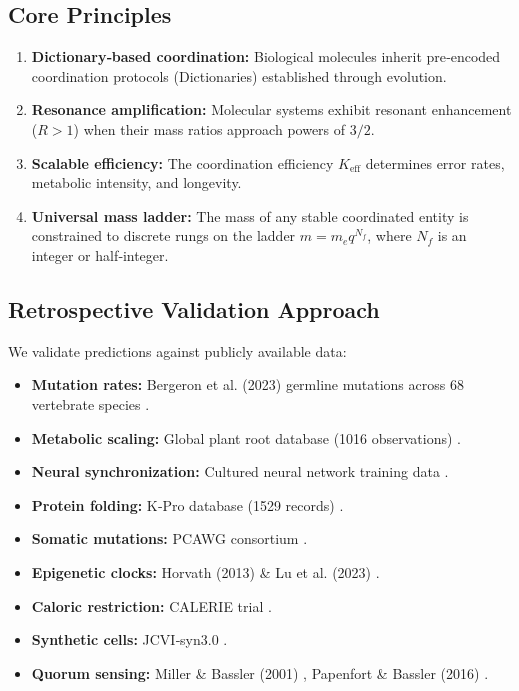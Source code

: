 \documentclass[11pt,a4paper]{article}
\begin{document}
	\subsection{Core Principles}
	
	\begin{enumerate}
		\item \textbf{Dictionary‑based coordination:} Biological molecules inherit pre‑encoded coordination protocols (Dictionaries) established through evolution.
		\item \textbf{Resonance amplification:} Molecular systems exhibit resonant enhancement (\(R > 1\)) when their mass ratios approach powers of \(3/2\).
		\item \textbf{Scalable efficiency:} The coordination efficiency \(K_{\mathrm{eff}}\) determines error rates, metabolic intensity, and longevity.
		\item \textbf{Universal mass ladder:} The mass of any stable coordinated entity is constrained to discrete rungs on the ladder \(m = m_e q^{N_f}\), where \(N_f\) is an integer or half‑integer.
	\end{enumerate}
	
	\subsection{Retrospective Validation Approach}
	
	We validate predictions against publicly available data:
	\begin{itemize}
		\item \textbf{Mutation rates:} Bergeron et al. (2023) germline mutations across 68 vertebrate species \cite{Bergeron2023a}.
		\item \textbf{Metabolic scaling:} Global plant root database (1016 observations) \cite{Yuan2020}.
		\item \textbf{Neural synchronization:} Cultured neural network training data \cite{PLOS2025b}.
		\item \textbf{Protein folding:} K‑Pro database (1529 records) \cite{Turina2023}.
		\item \textbf{Somatic mutations:} PCAWG consortium \cite{PCAWG2020}.
		\item \textbf{Epigenetic clocks:} Horvath (2013) \& Lu et al. (2023) \cite{Horvath2013, Lu2023}.
		\item \textbf{Caloric restriction:} CALERIE trial \cite{CALERIE2018, CALERIE2024}.
		\item \textbf{Synthetic cells:} JCVI‑syn3.0 \cite{Hutchison2016, Pelletier2023}.
		\item \textbf{Quorum sensing:} Miller \& Bassler (2001) \cite{Miller2001}, Papenfort \& Bassler (2016) \cite{Papenfort2016}.
	\end{itemize}
	
\end{document}
